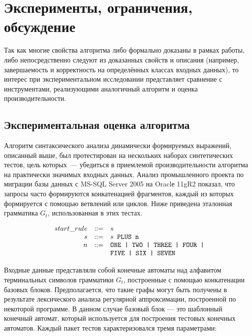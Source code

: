 \chapter{Эксперименты, ограничения, обсуждение} \label{chaptEval}

Так как многие свойства алгоритма либо формально доказаны в рамках работы, либо непосредственно следуют из доказанных свойств и описания (например, завершаемость и корректность на определённых классах входных данных), то интерес при экспериментальном исследовании представляет сравнение с инструментами, реализующими аналогичный алгоритм и оценка производительности.


\section{Экспериментальная оценка алгоритма}\label{SyntTestsEvalDescr}

Алгоритм синтаксического анализа динамически формируемых выражений, описанный выше, был протестирован на нескольких наборах синтетических тестов, цель которых~--- убедиться в приемлемой производительности алгоритма на практически значимых входных данных. Анализ промышленного проекта по миграции базы данных с MS-SQL Server 2005 на Oraclе 11gR2 показал, что запросы часто формируются конкатенацией фрагментов, каждый из которых формируется с помощью ветвлений или циклов. Ниже приведена эталонная грамматика $G_t$, использованная в этих тестах.

$$
\begin{array}{crcl}
& start\_rule &::=& s \\
& s & ::= & s \mbox{\texttt{ PLUS }} \mbox{\texttt{n}}\\
& n & ::= & \mbox{\texttt{ONE | }} \mbox{\texttt{TWO | }} \mbox{\texttt{THREE | }} \mbox{\texttt{FOUR | }} \\
&   &     & \mbox{\texttt{FIVE | }} \mbox{\texttt{SIX | }} \mbox{\texttt{SEVEN}}
\end{array}
$$

Входные данные представляли собой конечные автоматы над алфавитом терминальных символов грамматики $G_t$, построенные с помощью конкатенации базовых блоков. Предполагается, что такие графы могут быть получены в результате лексического анализа регулярной аппроксимации, построенной по некоторой программе. В данном случае базовый блок --- это шаблонный конечный автомат, который используется для построения тестовых конечных автоматов. Каждый пакет тестов характеризовался тремя параметрами: 

